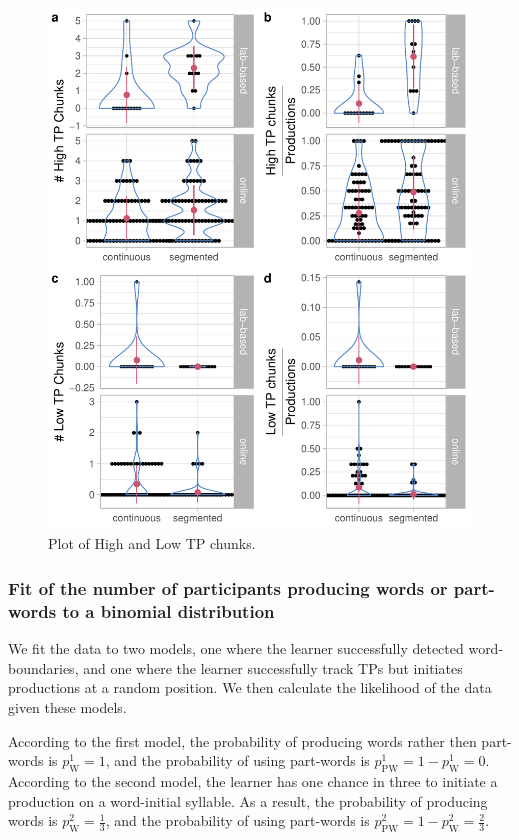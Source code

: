 \documentclass[
]{article}
\begin{document}
\begin{figure}

{\centering \includegraphics[width=0.8\linewidth]{segmentation_recall_combined_for_revision2_files/figure-latex/recall-tp-chunks-raw-plot-1} 

}

\caption{Plot of High and Low TP chunks.}\label{fig:recall-tp-chunks-raw-plot}
\end{figure}

\clearpage

\hypertarget{fit-of-the-number-of-participants-producing-words-or-part-words-to-a-binomial-distribution}{%
\subsubsection{Fit of the number of participants producing words or
part-words to a binomial
distribution}\label{fit-of-the-number-of-participants-producing-words-or-part-words-to-a-binomial-distribution}}

We fit the data to two models, one where the learner successfully
detected word-boundaries, and one where the learner successfully track
TPs but initiates productions at a random position. We then calculate
the likelihood of the data given these models.

According to the first model, the probability of producing words rather
then part-words is \(p^1_{\text{W}} = 1\), and the probability of using
part-words is \(p^1_{\text{PW}} = 1 - p^1_{\text{W}} = 0\). According to
the second model, the learner has one chance in three to initiate a
production on a word-initial syllable. As a result, the probability of
producing words is \(p^2_{\text{W}} = \frac{1}{3}\), and the probability
of using part-words is
\(p^2_{\text{PW}} = 1 - p^2_{\text{W}} = \frac{2}{3}\).
\end{document}
